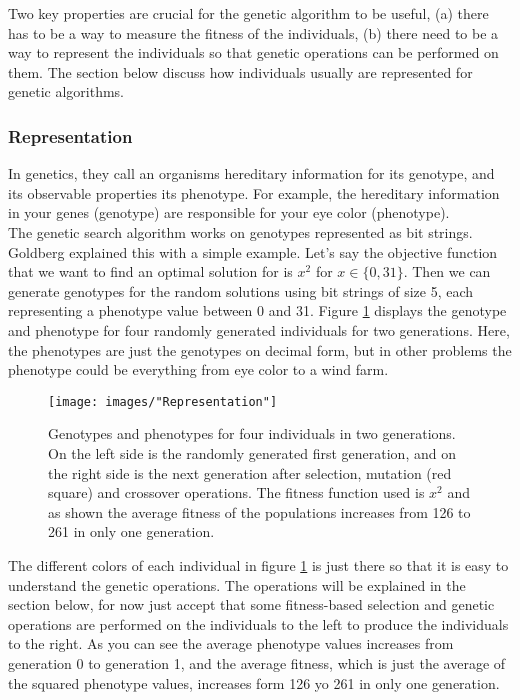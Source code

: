 \noindent Two key properties are crucial for the genetic algorithm to be useful, (a) there has to be a way to measure the fitness of the individuals, (b) there need to be a way to represent the individuals so that genetic operations can be performed on them. The section below discuss how individuals usually are represented for genetic algorithms.


\subsubsection{Representation}%
In genetics, they call an organisms hereditary information for its genotype, and its observable properties its phenotype. For example, the hereditary information in your genes (genotype) are responsible for your eye color (phenotype).\\

\noindent The genetic search algorithm works on genotypes represented as bit strings. Goldberg explained this with a simple example. Let's say the objective function that we want to find an optimal solution for is $x^2$ for $x \in \{0, 31\}$. Then we can generate genotypes for the random solutions using bit strings of size 5, each representing a phenotype value between 0 and 31. Figure \ref{Representation} displays the genotype and phenotype for four randomly generated individuals for two generations. Here, the phenotypes are just the genotypes on decimal form, but in other problems the phenotype could be everything from eye color to a wind farm.\\


\begin{figure}[h!]
\begin{center}
\texttt{[image: images/"Representation"]}
\caption{Genotypes and phenotypes for four individuals in two generations. On the left side is the randomly generated first generation, and on the right side is the next generation after selection, mutation (red square) and crossover operations. The fitness function used is $x^2$ and as shown the average fitness of the populations increases from 126 to 261 in only one generation.}
\label{Representation}
\end{center}
\end{figure}


\noindent The different colors of each individual in figure \ref{Representation} is just there so that it is easy to understand the genetic operations. The operations will be explained in the section below, for now just accept that some fitness-based selection and genetic operations are performed on the individuals to the left to produce the individuals to the right. As you can see the average phenotype values increases from generation 0 to generation 1, and the average fitness, which is just the average of the squared phenotype values, increases form 126 yo 261 in only one generation. 


